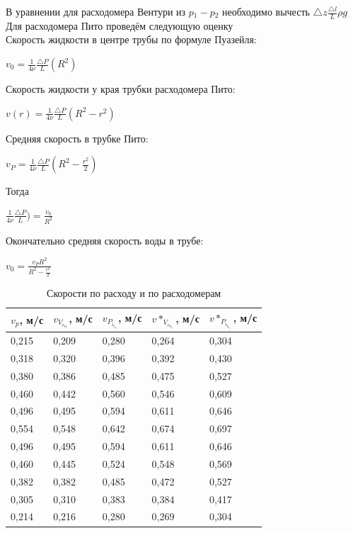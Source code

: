 \documentclass{article}
\begin{document}
\begin{enumerate}
В уравнении для расходомера Вентури из
$p{}_1{} - p{}_2{}$ необходимо вычесть $\triangle z\frac {\triangle l}{L}\rho g$\\
Для расходомера Пито проведём следующую оценку\\
Скорость жидкости в центре трубы по формуле Пуазейля:
\begin{center}
$v_0 =\frac{1}{4\nu}\frac{\triangle P}{L}(R^2)$
\end{center}
Скорость жидкости у края трубки расходомера Пито:\\
\begin{center}
$v(r) =\frac{1}{4\nu}\frac{\triangle P}{L}(R^2-r^2)$
\end{center}
Средняя скорость в трубке Пито:\\
\begin{center}
$v_P =\frac{1}{4\nu}\frac{\triangle P}{L}(R^2-\frac{r^2}{2})$
\end{center}
Тогда\\
\begin{center}
$\frac{1}{4\nu}\frac{\triangle P}{L}) =\frac{v_0}{R^2}$
\end{center}
Окончательно средняя скорость воды в трубе:\\
\begin{center}
$v_0 =\frac{v_P R^2}{R^2-\frac{r^2}{2}}$
\end{center}

\begin{table}[h]
    \centering
    \begin{center}
    \caption{Скорости по расходу и по расходомерам}
    \end{center}
    \vspace{0.1cm}
    \label{tab:my_label}
   \begin{tabular}{ |p{1.5cm}|p{1.5cm}|p{1.5cm}|p{1.5cm}|p{1.5cm}|  }
 \hline
 $v_p$, м/с & $v_V_e_n_t$, м/с & $v_P_i_t_o_t$, м/с & $v*_V_e_n_t$, м/с & $v*_P_i_t_o_t$, м/с   \\
\hline
0,215 & 0,209 & 0,280 &	0,264 &	0,304\\
0,318 & 0,320 &	0,396 &	0,392 &	0,430\\
0,380 & 0,386 &	0,485 &	0,475 &	0,527\\
0,460 & 0,442 &	0,560 &	0,546 &	0,609\\
0,496 & 0,495 &	0,594 &	0,611 &	0,646\\
0,554 & 0,548 &	0,642 &	0,674 &	0,697\\
0,496 & 0,495 &	0,594 &	0,611 &	0,646\\
0,460 & 0,445 &	0,524 &	0,548 &	0,569\\
0,382 & 0,382 &	0,485 &	0,472 &	0,527\\
0,305 & 0,310 &	0,383 &	0,384 &	0,417\\
0,214 & 0,216 &	0,280 &	0,269 &	0,304\\
\hline
\end{tabular}


\end{table}
\end{enumerate}
\end{document}

